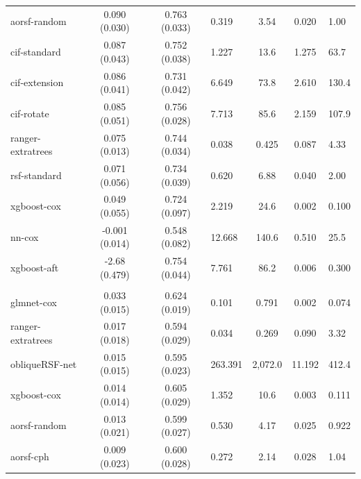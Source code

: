 \documentclass[twoside,11pt]{article}\usepackage[]{graphicx}\usepackage[]{xcolor}
\newenvironment{knitrout}{}{} %
\begin{document}
\begin{knitrout}
\begin{longtable}{lcclccl}
\hspace{1em}aorsf-random & 0.090 (0.030) & 0.763 (0.033) & 0.319 & 3.54 & 0.020 & 1.00\\
\hspace{1em}cif-standard & 0.087 (0.043) & 0.752 (0.038) & 1.227 & 13.6 & 1.275 & 63.7\\
\hspace{1em}cif-extension & 0.086 (0.041) & 0.731 (0.042) & 6.649 & 73.8 & 2.610 & 130.4\\
\hspace{1em}cif-rotate & 0.085 (0.051) & 0.756 (0.028) & 7.713 & 85.6 & 2.159 & 107.9\\
\hspace{1em}ranger-extratrees & 0.075 (0.013) & 0.744 (0.034) & 0.038 & 0.425 & 0.087 & 4.33\\
\hspace{1em}rsf-standard & 0.071 (0.056) & 0.734 (0.039) & 0.620 & 6.88 & 0.040 & 2.00\\
\hspace{1em}xgboost-cox & 0.049 (0.055) & 0.724 (0.097) & 2.219 & 24.6 & 0.002 & 0.100\\
\hspace{1em}nn-cox & -0.001 (0.014) & 0.548 (0.082) & 12.668 & 140.6 & 0.510 & 25.5\\
\hspace{1em}xgboost-aft & -2.68 (0.479) & 0.754 (0.044) & 7.761 & 86.2 & 0.006 & 0.300\\
\addlinespace[0.3em]
\hline
\multicolumn{7}{l}{\textit{\textbf{FCL; relapse, n = 541, p = 7}}}\\
\hline
\hspace{1em}glmnet-cox & 0.033 (0.015) & 0.624 (0.019) & 0.101 & 0.791 & 0.002 & 0.074\\
\hspace{1em}ranger-extratrees & 0.017 (0.018) & 0.594 (0.029) & 0.034 & 0.269 & 0.090 & 3.32\\
\hspace{1em}obliqueRSF-net & 0.015 (0.015) & 0.595 (0.023) & 263.391 & 2,072.0 & 11.192 & 412.4\\
\hspace{1em}xgboost-cox & 0.014 (0.014) & 0.605 (0.029) & 1.352 & 10.6 & 0.003 & 0.111\\
\hspace{1em}aorsf-random & 0.013 (0.021) & 0.599 (0.027) & 0.530 & 4.17 & 0.025 & 0.922\\
\hspace{1em}aorsf-cph & 0.009 (0.023) & 0.600 (0.028) & 0.272 & 2.14 & 0.028 & 1.04\\

\end{longtable}
\end{knitrout}
\end{document}
